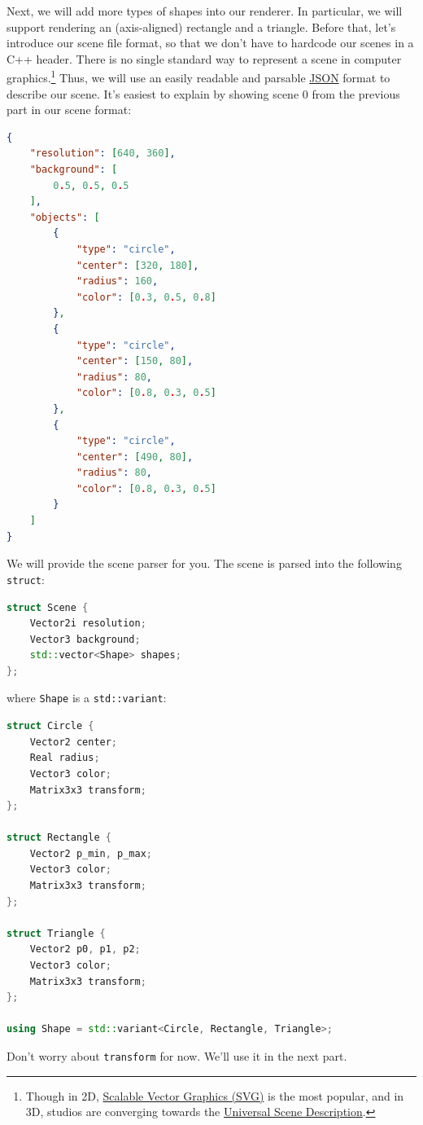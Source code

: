 Next, we will add more types of shapes into our renderer. In particular, we will support rendering an (axis-aligned) rectangle and a triangle. Before that, let's introduce our scene file format, so that we don't have to hardcode our scenes in a C++ header. There is no single standard way to represent a scene in computer graphics.\footnote{Though in 2D, \href{https://en.wikipedia.org/wiki/SVG}{Scalable Vector Graphics (SVG)} is the most popular, and in 3D, studios are converging towards the \href{https://en.wikipedia.org/wiki/Universal_Scene_Description}{Universal Scene Description}.} Thus, we will use an easily readable and parsable \href{https://en.wikipedia.org/wiki/JSON}{JSON} format to describe our scene. It's easiest to explain by showing scene 0 from the previous part in our scene format:
\begin{lstlisting}[language=json]
{
    "resolution": [640, 360],
    "background": [
        0.5, 0.5, 0.5
    ],
    "objects": [
        {
            "type": "circle",
            "center": [320, 180],
            "radius": 160,
            "color": [0.3, 0.5, 0.8]
        },
        {
            "type": "circle",
            "center": [150, 80],
            "radius": 80,
            "color": [0.8, 0.3, 0.5]
        },
        {
            "type": "circle",
            "center": [490, 80],
            "radius": 80,
            "color": [0.8, 0.3, 0.5]
        }
    ]
}
\end{lstlisting}

We will provide the scene parser for you. The scene is parsed into the following \lstinline{struct}:
\begin{lstlisting}[language=C++]
struct Scene {
    Vector2i resolution;
    Vector3 background;
    std::vector<Shape> shapes;
};
\end{lstlisting}
where \lstinline{Shape} is a \lstinline{std::variant}:
\begin{lstlisting}[language=C++]
struct Circle {
    Vector2 center;
    Real radius;
    Vector3 color;
    Matrix3x3 transform;
};

struct Rectangle {
    Vector2 p_min, p_max;
    Vector3 color;
    Matrix3x3 transform;
};

struct Triangle {
    Vector2 p0, p1, p2;
    Vector3 color;
    Matrix3x3 transform;
};

using Shape = std::variant<Circle, Rectangle, Triangle>;
\end{lstlisting}

Don't worry about \lstinline{transform} for now. We'll use it in the next part.

